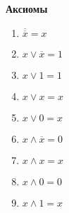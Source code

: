 \usepackage{wasysym}%




    \renewcommand{\arraystretch}{1.5}

    \begin{minipage}[t]{0.2\textwidth}
        \textbf{Аксиомы}
        \centering
        \begin{enumerate}
            \item $\overline{\overline x} = x$
            \item $x \vee \overline x = 1$
            \item $x \vee 1 = 1$
            \item $x \vee x = x$
            \item $x \vee 0 = x$
            \item $x \wedge \overline x = 0$
            \item $x \wedge x = x$
            \item $x \wedge 0 = 0$
            \item $x \wedge 1 = x$
        \end{enumerate}

    \end{minipage}
